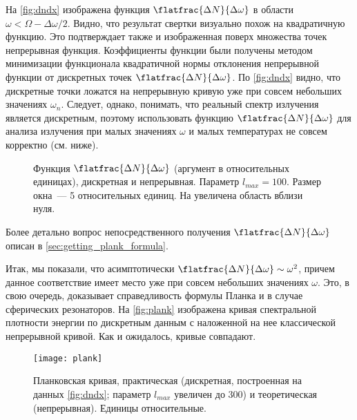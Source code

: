     На \autoref{fig:dndx} изображена функция $\flatfrac{\Delta N}{\Delta \omega}$ в области $\omega < \Omega - \Delta\omega / 2$. Видно, что результат свертки визуально похож на квадратичную функцию. Это подтверждает также и изображенная поверх множества точек непрерывная функция. Коэффициенты функции были получены методом минимизации функционала квадратичной нормы отклонения непрерывной функции от дискретных точек $\flatfrac{\Delta N}{\Delta \omega}$. По \autoref{fig:dndx} видно, что дискретные точки ложатся на непрерывную кривую уже при совсем небольших значениях $\omega_n$. Следует, однако, понимать, что реальный спектр излучения является дискретным, поэтому использовать функцию $\flatfrac{\Delta N}{\Delta \omega}$ для анализа излучения при малых значениях $\omega$ и малых температурах не совсем корректно (см. ниже).
    \begin{figure}[h]
        \centering
        \hspace{8pt}%
        \hspace{8pt}%
        \caption[]{Функция $\flatfrac{\Delta N}{\Delta \omega}$ (аргумент в относительных единицах), дискретная и непрерывная. Параметр $l_{max} = 100$. Размер окна~--- 5 относительных единиц. На  увеличена область вблизи нуля. %
        } %
        \label{fig:dndx}%
    \end{figure}

    Более детально вопрос непосредственного получения $\flatfrac{\Delta N}{\Delta \omega}$ описан в \autoref{sec:getting_plank_formula}.

    Итак, мы показали, что асимптотически $\flatfrac{\Delta N}{\Delta \omega} \sim \omega^2$, причем данное соответствие имеет место уже при совсем небольших значениях $\omega$. Это, в свою очередь, доказывает справедливость формулы Планка и в случае сферических резонаторов. На \autoref{fig:plank} изображена кривая спектральной плотности энергии по дискретным данным с наложенной на нее классической непрерывной кривой. Как и ожидалось, кривые совпадают.
    \begin{figure}[h]
        \centering
        \texttt{[image: plank]}
        \caption[]{Планковская кривая, практическая (дискретная, построенная на данных \autoref{fig:dndx}; параметр $l_{max}$ увеличен до $300$) и теоретическая (непрерывная). Единицы относительные.}
        \label{fig:plank}
    \end{figure}
